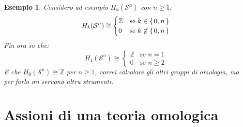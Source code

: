 \documentclass[10pt, twoside=false, x11names]{scrbook}
\newtheorem{example}[theorem]{Esempio}
\newcommand{\Z}{\mathbb{Z}}
\newcommand{\Sph}[1][]{\mathcal{S}^#1}
\begin{document}
\begin{example}
  Considero ad esempio $ H_k(\Sph{n}) $ con $ n \geq 1 $:
  \[
    H_k(\Sph{n}) \cong
    \begin{cases}
      \Z & \text{se } k \in \set{0,n} \\
      0 & \text{se } k \not \in \set{0,n}
    \end{cases}
  \]
  Fin ora so che:
  \[
    H_1(\Sph{n}) \cong
    \begin{cases}
      \Z & \text{se } n = 1 \\
      0 & \text{se } n \geq 2
    \end{cases}
  \]
  E che $ H_0(\Sph{n}) \cong \Z $ per $ n \geq 1 $, vorrei calcolare gli altri gruppi di omologia,
  ma per farlo mi servono altru strumenti.
\end{example}

\section{Assioni di una teoria omologica}
\end{document}
